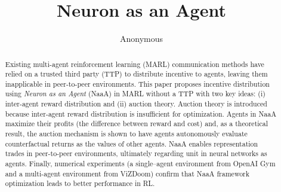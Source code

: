\documentclass{article} %
\title{Neuron as an Agent}
\author{Anonymous}
\begin{document}
\maketitle

\begin{abstract}
Existing multi-agent reinforcement learning (MARL) communication methods have relied on a trusted third party (TTP) to distribute incentive to agents, leaving them inapplicable in peer-to-peer environments.
This paper proposes incentive distribution using {\em Neuron as an Agent} (NaaA) in MARL without a TTP with two key ideas:
(i) inter-agent reward distribution and (ii) auction theory.
Auction theory is introduced because inter-agent reward distribution is insufficient for optimization.
Agents in NaaA maximize their profits (the difference between reward and cost) and, as a theoretical result, the auction mechanism is shown to have agents autonomously evaluate counterfactual returns as the values of other agents.
NaaA enables representation trades in peer-to-peer environments, ultimately regarding unit in neural networks as agents.
Finally, numerical experiments (a single--agent environment from OpenAI Gym and a multi-agent environment from ViZDoom) confirm that NaaA framework optimization leads to better performance in RL.
\end{abstract}











\end{document}
